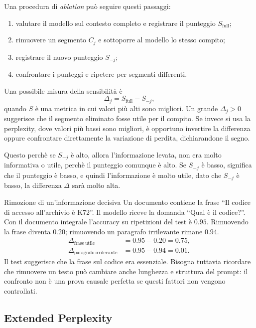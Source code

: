Una procedura di \emph{ablation} può seguire questi passaggi:
\begin{enumerate}
\item valutare il modello sul contesto completo e registrare il punteggio $S_{\mathrm{full}}$;
\item rimuovere un segmento $C_j$ e sottoporre al modello lo stesso compito;
\item registrare il nuovo punteggio $S_{-j}$;
\item confrontare i punteggi e ripetere per segmenti differenti.
\end{enumerate}

Una possibile misura della sensibilità è
\begin{equation}
\Delta_j=S_{\mathrm{full}}-S_{-j},
\end{equation}
quando $S$ è una metrica in cui valori più alti sono migliori. Un grande $\Delta_j>0$ suggerisce che il segmento eliminato fosse utile per il compito. Se invece si usa la perplexity, dove valori più bassi sono migliori, è opportuno invertire la differenza oppure confrontare direttamente la variazione di perdita, dichiarandone il segno.


Questo perchè se $S_{-j}$ è alto, allora l'informazione levata, non era molto informativa o utile, perchè il punteggio comunque è alto.
Se $S_{-j}$ è basso, significa che il punteggio è basso, e quindi l'informazione è molto utile, dato che $S_{-j}$ è basso, la differenza $\Delta$ sarà molto alta.

\begin{example}{Rimozione di un'informazione decisiva}
Un documento contiene la frase ``Il codice di accesso all'archivio è K72''. Il modello riceve la domanda ``Qual è il codice?''. Con il documento integrale l'accuracy su ripetizioni del test è $0.95$. Rimuovendo la frase diventa $0.20$; rimuovendo un paragrafo irrilevante rimane $0.94$.
\begin{align}
\Delta_{\mathrm{frase\ utile}}&=0.95-0.20=0.75,\\
\Delta_{\mathrm{paragrafo\ irrilevante}}&=0.95-0.94=0.01.
\end{align}
Il test suggerisce che la frase sul codice era essenziale. Bisogna tuttavia ricordare che rimuovere un testo può cambiare anche lunghezza e struttura del prompt: il confronto non è una prova causale perfetta se questi fattori non vengono controllati.
\end{example}

\subsection{Extended Perplexity}

